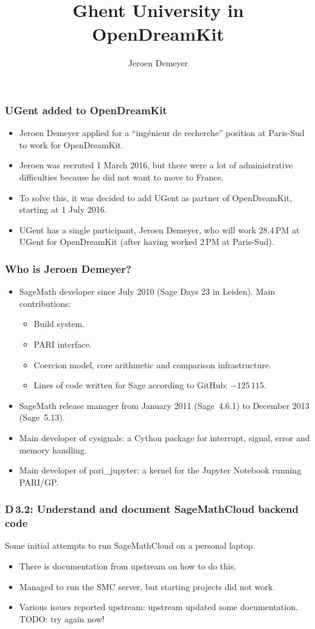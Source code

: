 \documentclass{beamer}
\title{Ghent University in OpenDreamKit}
\author{Jeroen Demeyer}
\begin{document}
\begin{frame}
  \titlepage
\end{frame}

\begin{frame}
\frametitle{UGent added to OpenDreamKit}

\begin{itemize}
\item Jeroen Demeyer applied for a ``ing\'enieur de recherche'' position
at Paris-Sud to work for OpenDreamKit.
\item Jeroen was recruted 1 March 2016,
but there were a lot of administrative difficulties because he did not want to move to France.
\item To solve this, it was decided to add UGent as partner of OpenDreamKit,
starting at 1 July 2016.
\item UGent has a single participant, Jeroen Demeyer,
who will work $28.4\,\text{PM}$ at UGent for OpenDreamKit
(after having worked $2\,\text{PM}$ at Paris-Sud).
\end{itemize}
\end{frame}

\begin{frame}
\frametitle{Who is Jeroen Demeyer?}

\begin{itemize}
\item SageMath developer since July 2010 (Sage Days 23 in Leiden).
Main contributions:
\begin{itemize}
\item Build system.
\item PARI interface.
\item Coercion model, core arithmetic and comparison infrastructure.
\item Lines of code written for Sage according to GitHub: $-125\,115$.
\end{itemize}
\item SageMath release manager from January 2011 (Sage~4.6.1) to December 2013 (Sage~5.13).
\item Main developer of cysignals:
a Cython package for interrupt, signal, error and memory handling.
\item Main developer of pari\_jupyter:
a kernel for the Jupyter Notebook running PARI/GP.
\end{itemize}
\end{frame}

\begin{frame}
\frametitle{D\,3.2: Understand and document SageMathCloud backend code}

Some initial attempts to run SageMathCloud on a personal laptop.

\begin{itemize}
\item There is documentation from upstream on how to do this.

\item Managed to run the SMC server, but starting projects did not work.

\item Various issues reported upstream: upstream updated some documentation.
TODO: try again now!
\end{itemize}
\end{frame}
\end{document}
